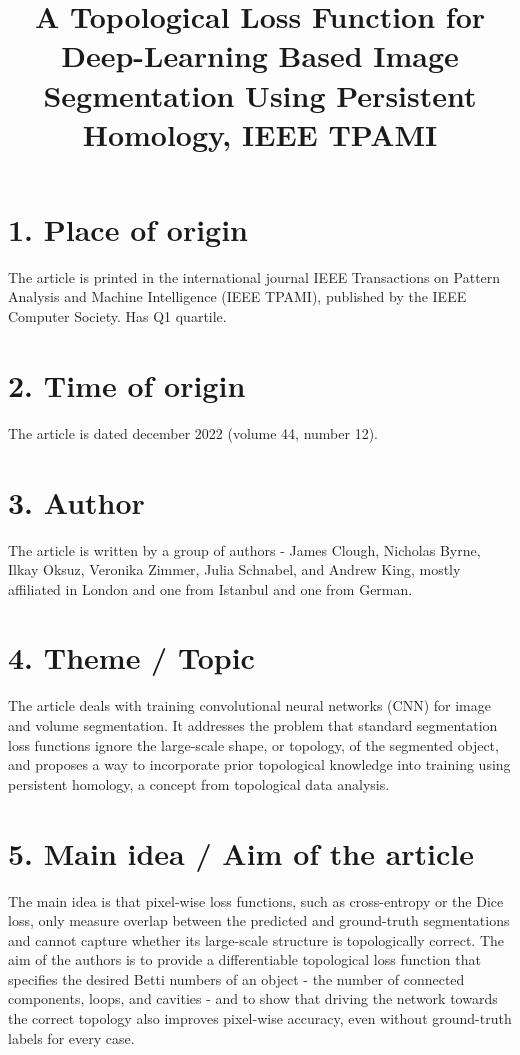 \documentclass[12pt,a4paper]{article}
\title{A Topological Loss Function for Deep-Learning Based Image Segmentation Using Persistent Homology, IEEE TPAMI}
\author{}
\date{}
\begin{document}
\maketitle

\section*{1. Place of origin}
    The article is printed in the international journal
    IEEE Transactions on Pattern Analysis and Machine Intelligence
    (IEEE TPAMI), published by the IEEE Computer Society. Has Q1 quartile.

\section*{2. Time of origin}
    The article is dated december 2022 (volume 44, number 12).

\section*{3. Author}
    The article is written by a group of authors - James Clough,
    Nicholas Byrne, Ilkay Oksuz, Veronika Zimmer, Julia Schnabel,
    and Andrew King, mostly affiliated in London and one from Istanbul and one from German.

\section*{4. Theme / Topic}
    The article deals with training convolutional neural networks (CNN)
    for image and volume segmentation. It addresses the problem that
    standard segmentation loss functions ignore the large-scale shape,
    or topology, of the segmented object, and proposes a way to
    incorporate prior topological knowledge into training using
    persistent homology, a concept from topological data analysis.

\section*{5. Main idea / Aim of the article}
    The main idea is that pixel-wise loss functions, such as
    cross-entropy or the Dice loss, only measure overlap between the
    predicted and ground-truth segmentations and cannot capture whether
    its large-scale structure is topologically correct. The aim of the
    authors is to provide a differentiable topological loss function
    that specifies the desired Betti numbers of an object - the number
    of connected components, loops, and cavities - and to show that
    driving the network towards the correct topology also improves
    pixel-wise accuracy, even without ground-truth labels for every
    case.
\end{document}
